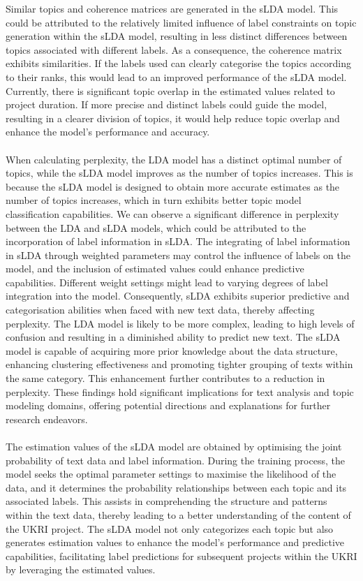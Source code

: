 \documentclass[12pt,twoside]{article}
\begin{document}
Similar topics and coherence matrices are generated in the sLDA model. This could be attributed to the relatively limited influence of label constraints on topic generation within the sLDA model, resulting in less distinct differences between topics associated with different labels. As a consequence, the coherence matrix exhibits similarities. If the labels used can clearly categorise the topics according to their ranks, this would lead to an improved performance of the sLDA model. Currently, there is significant topic overlap in the estimated values related to project duration. If more precise and distinct labels could guide the model, resulting in a clearer division of topics, it would help reduce topic overlap and enhance the model's performance and accuracy.\\\\

When calculating perplexity, the LDA model has a distinct optimal number of topics, while the sLDA model improves as the number of topics increases. This is because the sLDA model is designed to obtain more accurate estimates as the number of topics increases, which in turn exhibits better topic model classification capabilities. We can observe a significant difference in perplexity between the LDA and sLDA models, which could be attributed to the incorporation of label information in sLDA. The integrating of label information in sLDA through weighted parameters may control the influence of labels on the model, and the inclusion of estimated values could enhance predictive capabilities. Different weight settings might lead to varying degrees of label integration into the model. Consequently, sLDA exhibits superior predictive and categorisation abilities when faced with new text data, thereby affecting perplexity. The LDA model is likely to be more complex, leading to high levels of confusion and resulting in a diminished ability to predict new text. The sLDA model is capable of acquiring more prior knowledge about the data structure, enhancing clustering effectiveness and promoting tighter grouping of texts within the same category. This enhancement further contributes to a reduction in perplexity. These findings hold significant implications for text analysis and topic modeling domains, offering potential directions and explanations for further research endeavors.\\\\

The estimation values of the sLDA model are obtained by optimising the joint probability of text data and label information. During the training process, the model seeks the optimal parameter settings to maximise the likelihood of the data, and it determines the probability relationships between each topic and its associated labels. This assists in comprehending the structure and patterns within the text data, thereby leading to a better understanding of the content of the UKRI project. The sLDA model not only categorizes each topic but also generates estimation values to enhance the model's performance and predictive capabilities, facilitating label predictions for subsequent projects within the UKRI by leveraging the estimated values.\\\\
\end{document}
